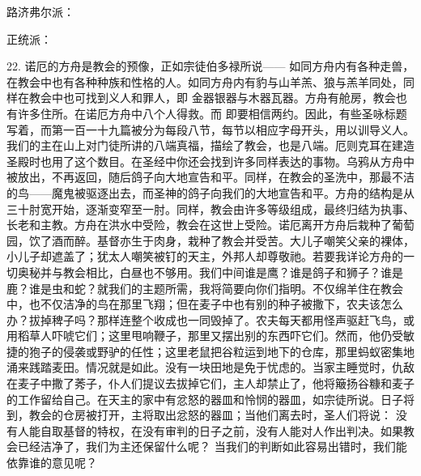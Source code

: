路济弗尔派：\par

正统派：\par

22. 诺厄的方舟是教会的预像，正如宗徒伯多禄所说—— 如同方舟内有各种走兽，在教会中也有各种种族和性格的人。如同方舟内有豹与山羊羔、狼与羔羊同处，同样在教会中也可找到义人和罪人，即 金器银器与木器瓦器。方舟有舱房，教会也有许多住所。在诺厄方舟中八个人得救。而 即要相信两约。因此，有些圣咏标题写着，而第一百一十九篇被分为每段八节，每节以相应字母开头，用以训导义人。我们的主在山上对门徒所讲的八端真福，描绘了教会，也是八端。厄则克耳在建造圣殿时也用了这个数目。在圣经中你还会找到许多同样表达的事物。乌鸦从方舟中被放出，不再返回，随后鸽子向大地宣告和平。同样，在教会的圣洗中，那最不洁的鸟——魔鬼被驱逐出去，而圣神的鸽子向我们的大地宣告和平。方舟的结构是从三十肘宽开始，逐渐变窄至一肘。同样，教会由许多等级组成，最终归结为执事、长老和主教。方舟在洪水中受险，教会在这世上受险。诺厄离开方舟后栽种了葡萄园，饮了酒而醉。基督亦生于肉身，栽种了教会并受苦。大儿子嘲笑父亲的裸体，小儿子却遮盖了；犹太人嘲笑被钉的天主，外邦人却尊敬祂。若要我详论方舟的一切奥秘并与教会相比，白昼也不够用。我们中间谁是鹰？谁是鸽子和狮子？谁是鹿？谁是虫和蛇？就我们的主题所需，我将简要向你们指明。不仅绵羊住在教会中，也不仅洁净的鸟在那里飞翔；但在麦子中也有别的种子被撒下，农夫该怎么办？拔掉稗子吗？那样连整个收成也一同毁掉了。农夫每天都用怪声驱赶飞鸟，或用稻草人吓唬它们；这里甩响鞭子，那里又摆出别的东西吓它们。然而，他仍受敏捷的狍子的侵袭或野驴的任性；这里老鼠把谷粒运到地下的仓库，那里蚂蚁密集地涌来践踏麦田。情况就是如此。没有一块田地是免于忧虑的。当家主睡觉时，仇敌在麦子中撒了莠子，仆人们提议去拔掉它们，主人却禁止了，他将簸扬谷糠和麦子的工作留给自己。在天主的家中有忿怒的器皿和怜悯的器皿，如宗徒所说。日子将到，教会的仓房被打开，主将取出忿怒的器皿；当他们离去时，圣人们将说： 没有人能自取基督的特权，在没有审判的日子之前，没有人能对人作出判决。如果教会已经洁净了，我们为主还保留什么呢？ 当我们的判断如此容易出错时，我们能依靠谁的意见呢？\par

